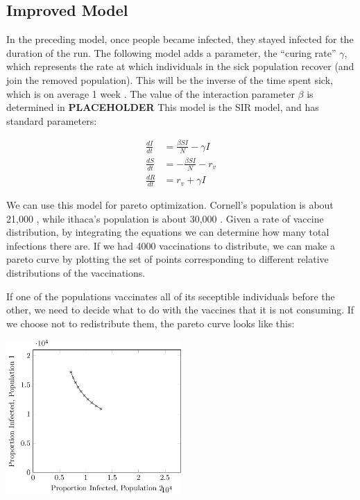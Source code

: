 \documentclass[titlepage]{article}
\begin{document}
\subsection{Improved Model}

In the preceding model, once people became infected, they stayed
	infected for the duration of the run.
The following model adds a parameter, the ``curing rate'' $\gamma$,
	which represents the rate at which individuals in the sick population
	recover (and join the removed population).
This will be the inverse of the time spent sick, which is on average
	1 week \cite{CIC-stats}.
The value of the interaction parameter $\beta$ is determined in \textbf{PLACEHOLDER}
This model is the SIR model, and has standard parameters:

\begin{align*}
\frac{dI}{dt} & = \frac{ \beta S I}{N} - \gamma I\\
\frac{dS}{dt} & = -\frac{\beta S I}{N} - r_v \\
\frac{dR}{dt} & = r_v + \gamma I
\end{align*}

We can use this model for pareto optimization.
Cornell's population is about 21,000 \cite{cornellpop},
	while ithaca's population is about 30,000 \cite{census}.
Given a rate of vaccine distribution, by integrating the equations
	we can determine how many total infections there are.
If we had 4000 vaccinations to distribute, we can make a pareto
	curve by plotting the set of points corresponding to different
	relative distributions of the vaccinations.

If one of the populations vaccinates all of its seceptible individuals
	before the other, we need to decide what to do with the vaccines
	that it is not consuming.
If we choose not to redistribute them, the pareto curve looks like this:

\includegraphics[width=0.5\textwidth]{figures/sir-pareto.pdf}
\end{document}
